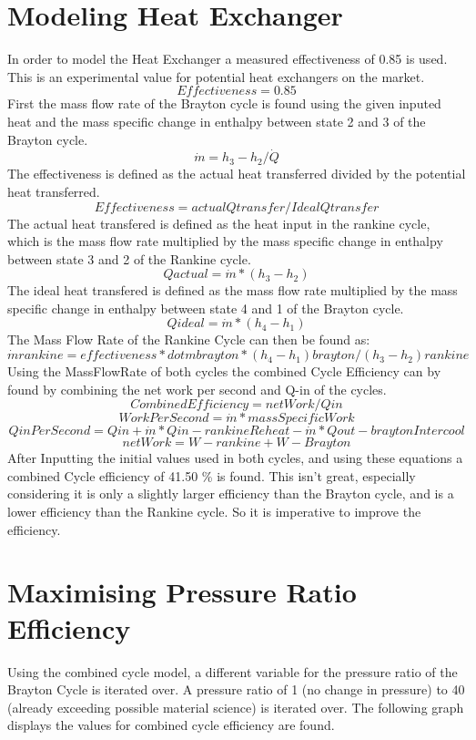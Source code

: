 \documentclass{article}
\begin{document}
\section{Modeling Heat Exchanger}
In order to model the Heat Exchanger a measured effectiveness of 0.85 is used. This is an experimental value for potential heat exchangers on the market.
    \[Effectiveness = 0.85\]
First the mass flow rate of the Brayton cycle is found using the given inputed heat and the mass specific change in enthalpy between state 2 and 3 of the Brayton cycle.
    \[\dot{m} = h_3 - h_2 / \dot{Q}\]
The effectiveness is defined as the actual heat transferred divided by the potential heat transferred.
   \[Effectiveness = actual Q transfer/ Ideal Q transfer\]
The actual heat transfered is defined as the heat input in the rankine cycle, which is the mass flow rate multiplied by the mass specific change in enthalpy between state 3 and 2 of the Rankine cycle.
   \[Qactual = \dot{m} * (h_3 - h_2)\]
The ideal heat transfered is defined as the mass flow rate multiplied by the mass specific change in enthalpy between state 4 and 1 of the Brayton cycle.
    \[Qideal = \dot{m} * (h_4 - h_1)\]
The Mass Flow Rate of the Rankine Cycle can then be found as:
    \[\dot{m}rankine = effectiveness * dot{m}brayton * (h_4 - h_1)brayton / (h_3 - h_2)rankine\]
Using the MassFlowRate of both cycles the combined Cycle Efficiency can by found by combining the net work per second and Q-in of the cycles.
    \[CombinedEfficiency = netWork/Qin\]
    \[WorkPerSecond = \dot{m} * massSpecificWork\]
    \[QinPerSecond = Qin + \dot{m} * Qin-rankineReheat - \dot{m} * Qout-braytonIntercool\]
    \[netWork = W-rankine + W-Brayton\]
After Inputting the initial values used in both cycles, and using these equations a combined Cycle efficiency of 41.50 \% is found. This isn't great, especially considering it is only a slightly larger efficiency than the Brayton cycle, and is a lower efficiency than the Rankine cycle. So it is imperative to improve the efficiency.

\section{Maximising Pressure Ratio Efficiency}
Using the combined cycle model, a different variable for the pressure ratio of the Brayton Cycle is iterated over. A pressure ratio of 1 (no change in pressure) to 40 (already exceeding possible material science) is iterated over. The following graph displays the values for combined cycle efficiency are found.
\end{document}
